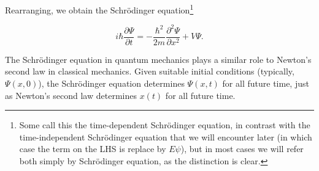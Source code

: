 \documentclass[a4paper,12pt]{report}
\begin{document}
Rearranging, we obtain the Schrödinger equation\footnote{Some call this the time-dependent Schrödinger equation, in contrast with the time-independent Schrödinger equation that we will encounter later (in which case the term on the LHS is replace by \(E\psi \)), but in most cases we will refer both simply by Schrödinger equation, as the distinction is clear.} 

\begin{equation}
  i \hbar \frac{\partial \Psi}{\partial t}=-\frac{\hbar^2}{2 m} \frac{\partial^2 \Psi}{\partial x^2}+V \Psi .\label{scr}
\end{equation}

The Schrödinger equation in quantum mechanics plays a similar role to Newton's second law in classical mechanics. Given suitable initial conditions (typically, $\Psi(x, 0)$), the Schrödinger equation determines $\Psi(x, t)$ for all future time, just as Newton's second law determines $x(t)$ for all future time.
\end{document}
